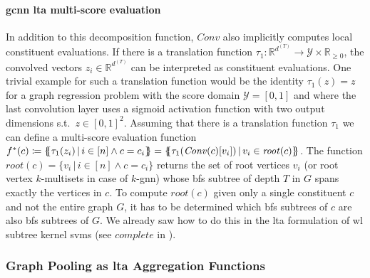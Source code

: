 \paragraph{\ac{gcnn} \ac{lta} multi-score evaluation}
In addition to this decomposition function, $\mathit{Conv}$ also implicitly computes local constituent evaluations.
If there is a translation function $\tau_{1}: \mathbb{R}^{d^{(T)}} \to \mathcal{Y} \times \mathbb{R}_{\geq 0}$, the convolved vectors $z_i \in \mathbb{R}^{d^{(T)}}$ can be interpreted as constituent evaluations.
One trivial example for such a translation function would be the identity $\tau_{1}(z) = z$ for a graph regression problem with the score domain $\mathcal{Y} = [0, 1]$ and where the last convolution layer uses a sigmoid activation function with two output dimensions s.t.\ $z \in {[0,1]}^2$.
Assuming that there is a translation function $\tau_{1}$ we can define a multi-score evaluation function $f^{*}(c) \coloneqq {\ldblbrace \tau_{1}(z_i)\, |\, {i \in [n]} \land {c = c_i} \rdblbrace} = {\ldblbrace \tau_{1}(\mathit{Conv}(c)[v_i])\, |\, v_i \in \mathit{root}(c) \rdblbrace}$.
The function $\mathit{root}(c) = \{ v_i\, |\, {i \in [n]} \land {c = c_i} \}$ returns the set of root vertices $v_i$ (or root vertex $k$-multisets in case of $k$-\acs{gnn}) whose \ac{bfs} subtree of depth $T$ in $G$ spans exactly the vertices in $c$.
To compute $\mathit{root}(c)$ given only a single constituent $c$ and not the entire graph $G$, it has to be determined which \ac{bfs} subtrees of $c$ are also \ac{bfs} subtrees of $G$.
We already saw how to do this in the \ac{lta} formulation of \ac{wl} subtree kernel \acp{svm} (see $\mathit{complete}$ in ).

\subsubsection{Graph Pooling as \ac*{lta} Aggregation Functions}

